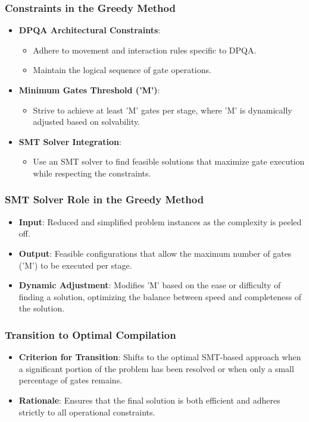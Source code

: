\documentclass[18 pt]{beamer}
\begin{document}
\begin{frame}
    \frametitle{Constraints in the Greedy Method}
    \begin{itemize}
        \item \textbf{DPQA Architectural Constraints}:
        \begin{itemize}
            \item Adhere to movement and interaction rules specific to DPQA.
            \item Maintain the logical sequence of gate operations.
        \end{itemize}
        \item \textbf{Minimum Gates Threshold ('M')}:
        \begin{itemize}
            \item Strive to achieve at least 'M' gates per stage, where 'M' is dynamically adjusted based on solvability.
        \end{itemize}
        \item \textbf{SMT Solver Integration}:
        \begin{itemize}
            \item Use an SMT solver to find feasible solutions that maximize gate execution while respecting the constraints.
        \end{itemize}
    \end{itemize}
\end{frame}

\begin{frame}
    \frametitle{SMT Solver Role in the Greedy Method}
    \begin{itemize}
        \item \textbf{Input}: Reduced and simplified problem instances as the complexity is peeled off.
        \item \textbf{Output}: Feasible configurations that allow the maximum number of gates ('M') to be executed per stage.
        \item \textbf{Dynamic Adjustment}: Modifies 'M' based on the ease or difficulty of finding a solution, optimizing the balance between speed and completeness of the solution.
    \end{itemize}
\end{frame}

\begin{frame}
    \frametitle{Transition to Optimal Compilation}
    \begin{itemize}
        \item \textbf{Criterion for Transition}: Shifts to the optimal SMT-based approach when a significant portion of the problem has been resolved or when only a small percentage of gates remains.
        \item \textbf{Rationale}: Ensures that the final solution is both efficient and adheres strictly to all operational constraints.
    \end{itemize}
\end{frame}
\end{document}
